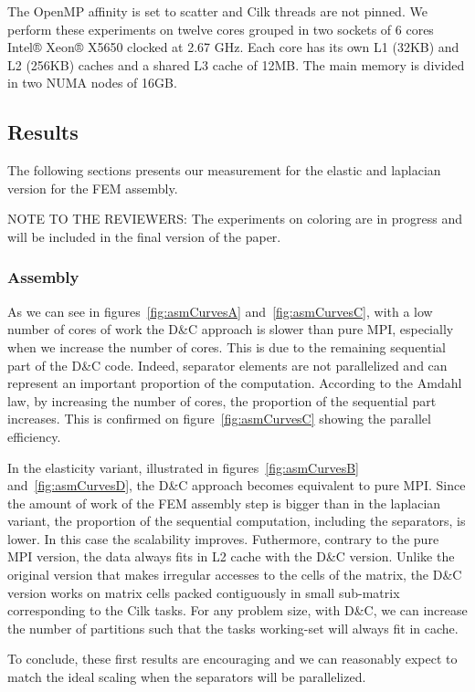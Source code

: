 \documentclass{IOS-Book-Article}
\begin{document}
The OpenMP affinity is set to scatter and Cilk threads are not pinned.
We perform these experiments on twelve cores grouped in two sockets of 6 cores Intel® Xeon® X5650 clocked at 2.67 GHz.
Each core has its own L1 (32KB) and L2 (256KB) caches and a shared L3 cache of 12MB. The main memory is divided in two NUMA nodes of 16GB.

\subsection{Results}

The following sections presents our measurement for the elastic and laplacian version for the FEM assembly. 

NOTE TO THE REVIEWERS: The experiments on coloring are in progress and will be included in the final version of the paper.

\subsubsection{Assembly}
As we can see in figures~\ref{fig:asmCurvesA} and~\ref{fig:asmCurvesC}, with a low number of cores of work the D\&C approach is slower than pure MPI, especially when we increase
the number of cores.
This is due to the remaining sequential part of the D\&C code.
Indeed, separator elements are not parallelized and can represent an important proportion of the computation.
According to the Amdahl law, by increasing the number of cores, the proportion of the sequential part increases. This is confirmed on figure~\ref{fig:asmCurvesC} showing the parallel efficiency.

In the elasticity variant, illustrated in figures~\ref{fig:asmCurvesB} and~\ref{fig:asmCurvesD}, the D\&C approach becomes equivalent to pure MPI.
Since the amount of work of the FEM assembly step is bigger than in the laplacian variant, the proportion of the sequential computation, including the separators, is lower.
In this case the scalability improves. Futhermore, contrary to the pure MPI version, the data always fits in L2 cache with the D\&C version.
Unlike the original version that makes irregular accesses to the cells of the matrix, the D\&C version works on matrix cells packed contiguously in small sub-matrix corresponding to the Cilk tasks.
For any problem size, with D\&C, we can increase the number of partitions such that the tasks working-set will always fit in cache.

To conclude, these first results are encouraging and we can reasonably expect to match the ideal scaling when the separators will be parallelized.
\end{document}

